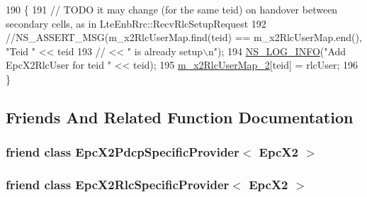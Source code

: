 \begin{DoxyCode}
190 \{
191   \textcolor{comment}{// TODO it may change (for the same teid) on handover between secondary cells, as in
       LteEnbRrc::RecvRlcSetupRequest}
192   \textcolor{comment}{//NS\_ASSERT\_MSG(m\_x2RlcUserMap.find(teid) == m\_x2RlcUserMap.end(), "Teid " << teid}
193   \textcolor{comment}{//  << " is already setup\(\backslash\)n");}
194   \hyperlink{group__logging_gafbd73ee2cf9f26b319f49086d8e860fb}{NS\_LOG\_INFO}(\textcolor{stringliteral}{"Add EpcX2RlcUser for teid "} << teid);
195   \hyperlink{classns3_1_1EpcX2_a71669e6a9be4d7640d05d8ff9fc21e62}{m\_x2RlcUserMap\_2}[teid] = rlcUser;
196 \}
\end{DoxyCode}


\subsection{Friends And Related Function Documentation}
\subsubsection[{\texorpdfstring{Epc\+X2\+Pdcp\+Specific\+Provider$<$ Epc\+X2 $>$}{EpcX2PdcpSpecificProvider< EpcX2 >}}]{\setlength{\rightskip}{0pt plus 5cm}friend class {\bf Epc\+X2\+Pdcp\+Specific\+Provider}$<$ {\bf Epc\+X2} $>$\hspace{0.3cm}{\ttfamily [friend]}}\hypertarget{classns3_1_1EpcX2_a372bb6d7b4f9b08802172b6cf02ecd2d}{}\label{classns3_1_1EpcX2_a372bb6d7b4f9b08802172b6cf02ecd2d}
\subsubsection[{\texorpdfstring{Epc\+X2\+Rlc\+Specific\+Provider$<$ Epc\+X2 $>$}{EpcX2RlcSpecificProvider< EpcX2 >}}]{\setlength{\rightskip}{0pt plus 5cm}friend class {\bf Epc\+X2\+Rlc\+Specific\+Provider}$<$ {\bf Epc\+X2} $>$\hspace{0.3cm}{\ttfamily [friend]}}\hypertarget{classns3_1_1EpcX2_ad723f727ad6075fde297057b65793220}{}\label{classns3_1_1EpcX2_ad723f727ad6075fde297057b65793220}
